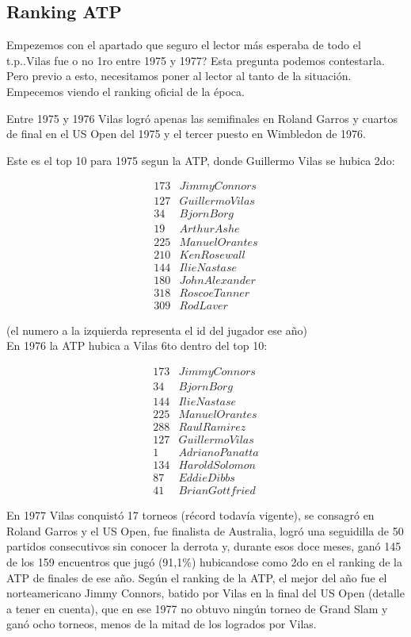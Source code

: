 \subsection{Ranking ATP}

Empezemos con el apartado que seguro el lector más esperaba de todo el t.p..Vilas fue o no 1ro entre 1975 y 1977? Esta pregunta podemos contestarla. Pero previo a esto, necesitamos poner al lector al tanto de la situación. Empecemos viendo el ranking oficial de la época.


Entre 1975 y 1976 Vilas logró apenas las semifinales en Roland Garros y cuartos de final en el US Open del 1975 y el tercer puesto en Wimbledon de 1976.


Este es el top 10 para 1975 segun la ATP, donde Guillermo Vilas se hubica 2do:

\begin{eqnarray*}
173 & Jimmy Connors \\
127 & Guillermo Vilas \\
34 & Bjorn Borg \\
19 & Arthur Ashe \\
225 & Manuel Orantes \\
210 & Ken Rosewall \\
144 & Ilie Nastase \\
180 & John Alexander \\
318 & Roscoe Tanner \\
309 & Rod Laver 
\end{eqnarray*}

(el numero a la izquierda representa el id del jugador ese año)\\


En 1976 la ATP hubica a Vilas 6to dentro del top 10:

\begin{eqnarray*}
173 & Jimmy Connors \\
34 & Bjorn Borg \\
144 & Ilie Nastase \\
225 & Manuel Orantes \\
288 & Raul Ramirez \\
127 & Guillermo Vilas \\
1 & Adriano Panatta \\
134 & Harold Solomon \\
87 & Eddie Dibbs \\
41 & Brian Gottfried 
\end{eqnarray*}

En 1977 Vilas conquistó 17 torneos (récord todavía vigente), se consagró en Roland Garros y el US Open, fue finalista de Australia, logró una seguidilla de 50 partidos consecutivos sin conocer la derrota y, durante esos doce meses, ganó 145 de los 159 encuentros que jugó (91,1\%) hubicandose como 2do en el ranking de la ATP de finales de ese año.
Según el ranking de la ATP, el mejor del año fue el norteamericano Jimmy Connors, batido por Vilas en la final del US Open (detalle a tener en cuenta), que en ese 1977 no obtuvo ningún torneo de Grand Slam y ganó ocho torneos, menos de la mitad de los logrados por Vilas.  



